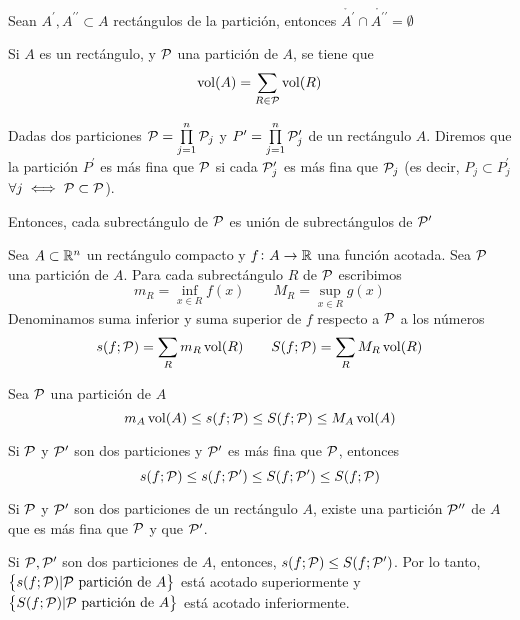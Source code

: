 \begin{obs*}
	Sean $A^\prime,A^{\prime\prime}\subset A$ rectángulos de la partición, entonces
	$\mathring{A^\prime} \cap \mathring{A^{\prime\prime}} = \emptyset$
\end{obs*}

\begin{lema}
	Si $A$ es un rectángulo, y $\mathcal{P}$ una partición de $A$, se tiene que
	\[
		\operatorname{vol}(A) = \sum_{R \in \mathcal{P}} \operatorname{vol}(R)
	\]
\end{lema}

\begin{defi}
	Dadas dos particiones $\mathcal{P} = \prod\limits^n_{j=1} \mathcal{P}_j$ y
	$P^\prime = \prod\limits^n_{j=1} \mathcal{P}^\prime_j$ de un rectángulo $A$. Diremos
	que la partición $P^\prime$ es más fina que $\mathcal{P}$ si cada $\mathcal{P}^\prime_j$ es más
	fina que $\mathcal{P}_j$ (es decir, $P_j \subset P^\prime_j$ $\forall j \iff \mathcal{P}
	\subset \mathcal{P}$).

	Entonces, cada subrectángulo de $\mathcal{P}$ es unión de subrectángulos de
	$\mathcal{P}^\prime$
\end{defi}

\begin{defi}
	Sea $A \subset \mathbb{R}^n$ un rectángulo compacto y $f \colon A \to \mathbb{R}$ una
	función acotada. Sea $\mathcal{P}$ una partición de $A$. Para cada subrectángulo $R$
	de $\mathcal{P}$ escribimos
	\[
		m_R = \inf_{x \in R} f(x) \qquad M_R = \sup_{x \in R} g(x)
	\]
	Denominamos suma inferior y suma superior de $f$ respecto a $\mathcal{P}$ a los números
	\[
		s(f;\mathcal{P}) = \sum_R m_R\operatorname{vol}(R) \qquad S(f;\mathcal{P}) = \sum_R M_R\operatorname{vol}(R)
	\]
\end{defi}

\begin{obs}
	Sea $\mathcal{P}$ una partición de $A$
	\[
		m_A\operatorname{vol}(A) \leq s(f;\mathcal{P}) \leq S(f;\mathcal{P}) \leq M_A\operatorname{vol}(A)
	\]
\end{obs}
\begin{obs}
	Si $\mathcal{P}$ y $\mathcal{P}^\prime$ son dos particiones y $\mathcal{P}^\prime$ es más fina que
	$\mathcal{P}$, entonces
	\[
		s(f;\mathcal{P}) \leq s(f;\mathcal{P}^\prime) \leq S(f;\mathcal{P}^\prime) \leq S(f;\mathcal{P})
	\]
\end{obs}

\begin{lema}
	Si $\mathcal{P}$ y $\mathcal{P}^\prime$ son dos particiones de un rectángulo $A$, existe una
	partición $\mathcal{P}^{\prime\prime}$ de $A$ que es más fina que $\mathcal{P}$ y que
	$\mathcal{P}^\prime$.
\end{lema}

\begin{col}
	Si $\mathcal{P}, \mathcal{P}^\prime$ son dos particiones de $A$, entonces,
	$s(f;\mathcal{P}) \leq S(f;\mathcal{P}^\prime)$. Por lo tanto,
	$\left\{s(f;\mathcal{P}) \vert \mathcal{P} \text{ partición de } A\right\}$ está acotado superiormente
	y $\left\{S(f;\mathcal{P}) \vert\mathcal{P}\text{ partición de } A\right\}$ está acotado inferiormente.
\end{col}


